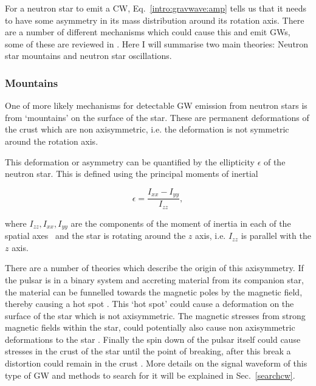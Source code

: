 For a neutron star to emit a \gls{CW}, Eq.~\ref{intro:gravwave:amp} tells us that it needs to have some asymmetry in its mass distribution around its rotation axis.  There are a number of different mechanisms which
could cause this and emit \glspl{GW}, some of these are reviewed in
\citep{glampedakis2017GravitationalWaves,riles2017RecentSearches,haskell2015DetectingGravitational,lasky2015GravitationalWaves}.
Here I will summarise two main theories: Neutron star mountains and neutron
star oscillations.

\subsubsection{\label{intro:source:cw:mountain}Mountains}

One of more likely mechanisms for detectable \gls{GW} emission from neutron
stars is from `mountains' on the surface of the star.  These are permanent
deformations of the crust which are non axisymmetric, i.e. the deformation is
not symmetric around the rotation axis.

This deformation or asymmetry can be quantified by the ellipticity $\epsilon$ of the neutron star.
This is defined using the principal moments of inertial

\begin{equation}
\label{ellipticity}
\epsilon = \frac{I_{xx}-I_{yy}}{I_{zz}},
\end{equation}

where $I_{zz},I_{xx},I_{yy}$ are the components of the moment of inertia in each of the spatial axes~ and the star is rotating around the $z$ axis, i.e. $I_{zz}$ is parallel with the $z$ axis.

There are a number of theories which describe the origin of this axisymmetry.
If the pulsar is in a binary system and accreting material from its companion
star, the material can be funnelled towards the magnetic poles by the magnetic
field, thereby causing a hot spot \citep{haskell2015DetectingGravitational}.
This `hot spot' could cause a deformation on the surface of the star which is
not axisymmetric.  The magnetic stresses from strong magnetic fields within the
star, could potentially also cause non axisymmetric deformations to the star
\citep{cutler2002GravitationalWaves}. Finally
the spin down of the pulsar itself could cause stresses in the crust of the
star until the point of breaking, after this break a
distortion could remain in the crust \citep{becker2009NeutronStars} .  
More details on the signal waveform of this type of \gls{GW} and methods to search for it will be explained in Sec.~\ref{searchcw}.
 
